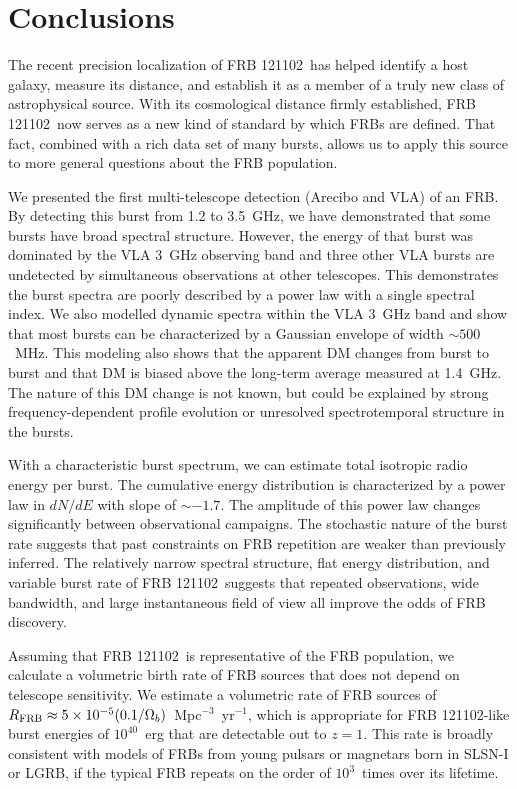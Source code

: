 \documentclass[twocolumn]{aastex61}
\newcommand{\frb}{FRB 121102}
\begin{document}
\section{Conclusions}

The recent precision localization of \frb\ has helped identify a host galaxy, measure its distance, and establish it as a member of a truly new class of astrophysical source. With its cosmological distance firmly established, \frb\ now serves as a new kind of standard by which FRBs are defined. That fact, combined with a rich data set of many bursts, allows us to apply this source to more general questions about the FRB population.

We presented the first multi-telescope detection (Arecibo and VLA) of an FRB. By detecting this burst from 1.2 to 3.5~GHz, we have demonstrated that some bursts have broad spectral structure. However, the energy of that burst was dominated by the VLA 3~GHz observing band and three other VLA bursts are undetected by simultaneous observations at other telescopes. This demonstrates the burst spectra are poorly described by a power law with a single spectral index. We also modelled dynamic spectra within the VLA 3~GHz band and show that most bursts can be characterized by a Gaussian envelope of width $\sim500$\ MHz. This modeling also shows that the apparent DM changes from burst to burst and that DM is biased above the long-term average measured at 1.4~GHz. The nature of this DM change is not known, but could be explained by strong frequency-dependent profile evolution or unresolved spectrotemporal structure in the bursts.

With a characteristic burst spectrum, we can estimate total isotropic radio energy per burst. The cumulative energy distribution is characterized by a power law in $dN/dE$ with slope of $\sim-1.7$. The amplitude of this power law changes significantly between observational campaigns. The stochastic nature of the burst rate suggests that past constraints on FRB repetition are weaker than previously inferred. The relatively narrow spectral structure, flat energy distribution, and variable burst rate of \frb\ suggests that repeated observations, wide bandwidth, and large instantaneous field of view all improve the odds of FRB discovery.

Assuming that \frb\ is representative of the FRB population, we calculate a volumetric birth rate of FRB sources that does not depend on telescope sensitivity. We estimate a volumetric rate of FRB sources of $R_{\rm{FRB}} \approx 5\times10^{-5} (0.1/\Omega_b)$\ Mpc$^{-3}$\ yr$^{-1}$, which is appropriate for \frb-like burst energies of $10^{40}$\ erg that are detectable out to $z=1$. This rate is broadly consistent with models of FRBs from young pulsars or magnetars born in SLSN-I or LGRB, if the typical FRB repeats on the order of $10^3$\ times over its lifetime.
\end{document}

